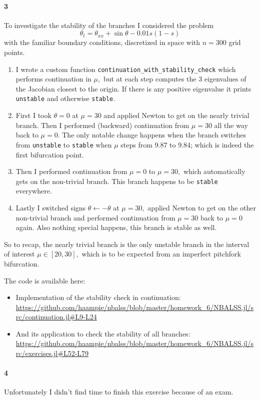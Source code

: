 \documentclass[a4paper]{article}
\begin{document}
  \paragraph{3} To investigate the stability of the branches I considered the problem $$\theta_t = \theta_{xx} + \sin \theta - 0.01 s(1-s)$$ with the familiar boundary conditions, discretized in space with $n = 300$ grid points.
  \begin{enumerate}
    \item I wrote a custom function {\tt continuation\_with\_stability\_check} which performs continuation in $\mu,$ but at each step computes the 3 eigenvalues of the Jacobian closest to the origin. If there is any positive eigenvalue it prints {\tt unstable} and otherwise {\tt stable}.
    \item First I took $\theta = 0$ at $\mu = 30$ and applied Newton to get on the nearly trivial branch. Then I performed (backward) continuation from $\mu = 30$ all the way back to $\mu = 0.$ The only notable change happens when the branch switches from {\tt unstable} to {\tt stable} when $\mu$ steps from 9.87 to 9.84; which is indeed the first bifurcation point.
    \item Then I performed continuation from $\mu = 0$ to $\mu = 30,$ which automatically gets on the non-trivial branch. This branch happens to be {\tt stable} everywhere.
    \item Lastly I switched signs $\theta \gets -\theta$ at $\mu = 30,$ applied Newton to get on the other non-trivial branch and performed continuation from $\mu = 30$ back to $\mu = 0$ again. Also nothing special happens, this branch is stable as well.
  \end{enumerate}
  So to recap, the nearly trivial branch is the only unstable branch in the interval of interest $\mu \in [20, 30],$ which is to be expected from an imperfect pitchfork bifurcation.

  The code is available here:
  \begin{itemize}
    \item Implementation of the stability check in continuation: \url{https://github.com/haampie/nbalss/blob/master/homework_6/NBALSS.jl/src/continuation.jl#L9-L24}
    \item And its application to check the stability of all branches: \url{https://github.com/haampie/nbalss/blob/master/homework_6/NBALSS.jl/src/exercises.jl#L52-L79}
  \end{itemize}

  \paragraph{4} Unfortunately I didn't find time to finish this exercise because of an exam.
\end{document}
